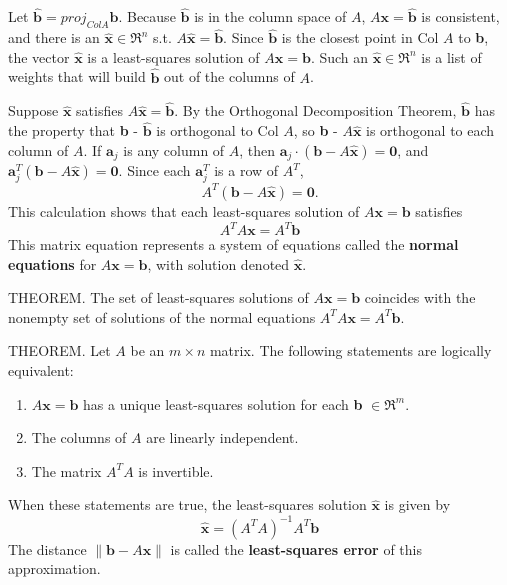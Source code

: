 \documentclass{article}
\begin{document}
\hfill \newline Let $\hat{\textbf{b}} = proj_{Col A}\textbf{b}$. Because $\hat{\textbf{b}}$ is in the column space of $A$, $A\textbf{x}=\hat{\textbf{b}}$ is consistent, and there is an $\hat{\textbf{x}} \in \Re^n$ s.t.  $A\hat{\textbf{x}}=\hat{\textbf{b}}$. Since $\hat{\textbf{b}}$ is the closest point in Col $A$ to \textbf{b}, the vector $\hat{\textbf{x}}$ is a least-squares solution of $A\textbf{x}=\textbf{b}$. Such an $\hat{\textbf{x}} \in \Re^n$ is a list of weights that will build $\hat{\textbf{b}}$ out of the columns of $A$.

\hfill \newline Suppose $\hat{\textbf{x}}$ satisfies $A\hat{\textbf{x}}=\hat{\textbf{b}}$. By the Orthogonal Decomposition Theorem, $\hat{\textbf{b}}$ has the property that \textbf{b} - $\hat{\textbf{b}}$ is orthogonal to Col $A$, so \textbf{b} - $A\hat{\textbf{x}}$ is orthogonal to each column of $A$. If $\textbf{a}_j$ is any column of $A$, then $\textbf{a}_j\cdot(\textbf{b}-A\hat{\textbf{x}}) = \textbf{0}$, and $\textbf{a}_j^T(\textbf{b}-A\hat{\textbf{x}}) = \textbf{0}$. Since each $\textbf{a}_j^T$ is a row of $A^T$, 
\begin{equation}
    A^T(\textbf{b}-A\hat{\textbf{x}}) = \textbf{0}.
\end{equation}
\noindent This calculation shows that each least-squares solution of $A\textbf{x}=\textbf{b}$ satisfies
\begin{equation}
    A^TA\textbf{x}=A^T\textbf{b}
\end{equation}
\noindent This matrix equation represents a system of equations called the \textbf{normal equations} for $A\textbf{x}=\textbf{b}$, with solution denoted $\hat{\textbf{x}}$.

\hfill \newline THEOREM. The set of least-squares solutions of $A\textbf{x}=\textbf{b}$ coincides with the nonempty set of solutions of the normal equations $A^TA\textbf{x}=A^T\textbf{b}$.

\hfill \newline THEOREM. Let $A$ be an $m \times n$ matrix. The following statements are logically equivalent: \begin{enumerate}
    \item $A\textbf{x}=\textbf{b}$ has a unique least-squares solution for each \textbf{b} $\in \Re^m$.
    \item The columns of $A$ are linearly independent.
    \item The matrix $A^TA$ is invertible.
\end{enumerate}
\noindent When these statements are true, the least-squares solution $\hat{\textbf{x}}$ is given by
\begin{equation}
    \hat{\textbf{x}} = (A^TA)^{-1}A^T\textbf{b}
\end{equation}
\noindent The distance $\|\textbf{b}-A\textbf{x}\|$ is called the \textbf{least-squares error} of this approximation.







    
\end{document}
